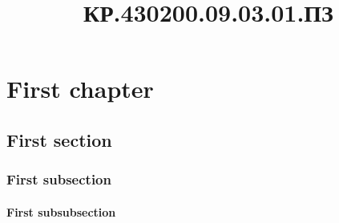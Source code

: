 \documentclass{kurreport}
\title{КР.430200.09.03.01.ПЗ}
\begin{document}
\BGfrom{\thepage}



\setcounter{page}{2}
\tableofcontents
\thispagestyle{empty}

\chapter{First chapter}
\section{First section}
\subsection{First subsection}
\subsubsection{First subsubsection}
\lipsum[1-1500]
\end{document}
